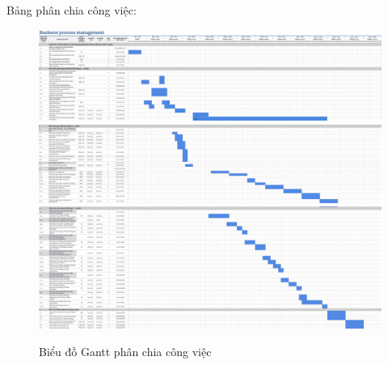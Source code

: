 Bảng phân chia công việc:
\begin{figure} [H]
    \centering
    \includegraphics[width = \linewidth]{Content/Giới thiệu đề tài/images/PCCV 0.png}
    \includegraphics[width = \linewidth]{Content/Giới thiệu đề tài/images/PCCV 1.png}
    \includegraphics[width = \linewidth]{Content/Giới thiệu đề tài/images/PCCV 2.png}
    \vspace{0.5cm}
    \caption{Biểu đồ Gantt phân chia công việc}
    \label{fig:Biểu đồ Gantt phân chia công việc}
\end{figure}